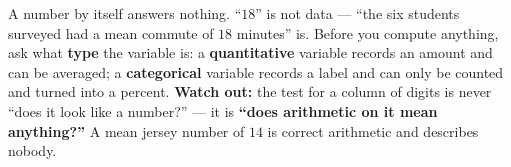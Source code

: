 \documentclass[12pt]{article}
\begin{document}
\vspace{0.14in}

\begin{remindbox}
\small
A number by itself answers nothing. ``$18$'' is not data --- ``the six students surveyed had
a mean commute of $18$ minutes'' is. Before you compute anything, ask what \textbf{type} the
variable is: a \textbf{quantitative} variable records an amount and can be averaged; a
\textbf{categorical} variable records a label and can only be counted and turned into a
percent. \textbf{Watch out:} the test for a column of digits is never ``does it look like a
number?'' --- it is \textbf{``does arithmetic on it mean anything?''} A mean jersey number of
$14$ is correct arithmetic and describes nobody.
\end{remindbox}
\end{document}
